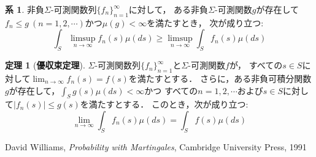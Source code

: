 \documentclass{jsreport}
\theoremstyle{definition}
\newtheorem{thm}[defi]{定理}
\newtheorem{cor}[defi]{系}
\begin{document}
\begin{cor}\label{reverse_Fatou_lemma}
非負$\Sigma$-可測関数列$\{f_n\}_{n=1}^\infty$に対して，
ある非負$\Sigma$-可測関数$g$が存在して
$f_n \leq g\ (n=1,2,\cdots)$かつ$\mu(g)<\infty$を満たすとき，
次が成り立つ:
\[ \int_S\limsup_{n\to\infty}f_n(s)\mu(ds)\geq\limsup_{n\to\infty}\int_S f_n(s)\mu(ds) \]
\end{cor}

\begin{thm}[\textbf{優収束定理}]\label{dominated_convergence_theorem}
$\Sigma$-可測関数列$\{f_n\}_{n=1}^\infty$と$\Sigma$-可測関数$f$が，
すべての$s \in S$に対して$\displaystyle\lim_{n\to\infty}f_n(s)=f(s)$を満たすとする．
さらに，ある非負可積分関数$g$が存在して，$\displaystyle\int_Sg(s)\mu(ds)<\infty$かつ
すべての$n=1,2,\cdots$および$s \in S$に対して$|f_n(s)| \leq g(s)$を満たすとする．
このとき，次が成り立つ:
\[ \lim_{n\to\infty}\int_Sf_n(s)\mu(ds)=\int_Sf(s)\mu(ds) \]
\end{thm}


\begin{thebibliography}{9}
\item David Williams, \textit{Probability with Martingales}, Cambridge University Press, 1991
\end{thebibliography}
\end{document}
